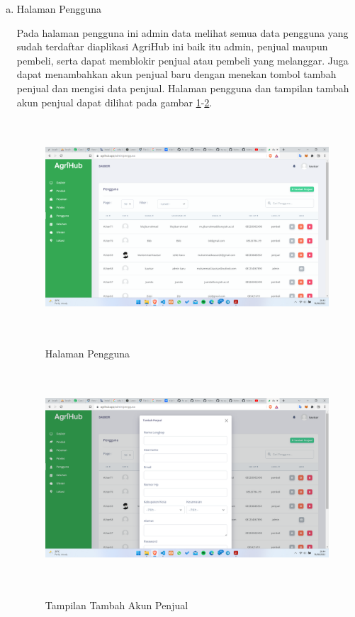 \begin{enumerate}
\begin{enumerate}[a.]
		\item Halaman Pengguna
		\par Pada halaman pengguna ini admin data melihat semua data pengguna yang sudah terdaftar diaplikasi AgriHub ini baik itu admin, penjual maupun pembeli, serta dapat memblokir penjual atau pembeli yang melanggar. Juga dapat menambahkan akun penjual baru dengan menekan tombol tambah penjual dan mengisi data penjual. Halaman pengguna dan tampilan tambah akun penjual dapat dilihat pada gambar \ref*{pengguna}-\ref*{tambah_pengguna}.
		\begin{figure}[H]
			\centering
			{\includegraphics [width = 13.5cm, height= 8cm]{gambar/admin/pengguna}}
			\caption{Halaman Pengguna}
			\label{pengguna}
		\end{figure}
		\begin{figure}[H]
			\centering
			{\includegraphics [width = 13.5cm, height= 8cm]{gambar/admin/tambah_pengguna}}
			\caption{Tampilan Tambah Akun Penjual}
			\label{tambah_pengguna}
		\end{figure}


\end{enumerate}
\end{enumerate}
